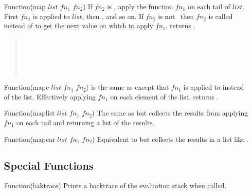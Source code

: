 \begin{defun}{Function}{(map $list$ $fn_{1}$ $fn_{2}$)}
  If $fn_{2}$ is \NIL, apply the function $fn_{1}$ on each tail of
  $list$. First $fn_{1}$ is applied to $list$, then ,
  and so on. If $fn_{2}$ is not \NIL\ then $fn_{2}$ is called instead
  of  to get the next value on which to apply $fn_{1}$.
   returns \NIL.

  \begin{quote}
    \\
    \\
    \\
    \\
    \NIL
  \end{quote}

\end{defun}

\begin{defun}{Function}{(mapc $list$ $fn_{1}$ $fn_{2}$)}
   is the same as  except that $fn_{1}$ is
  applied to  instead of the list. Effectively
  applying $fn_{1}$ on each element of the list.  returns
  \NIL.
\end{defun}


\begin{defun}{Function}{(maplist $list$ $fn_{1}$ $fn_{2}$)}
  The same as  but collects the results from applying
  $fn_{1}$ on each tail and returning a list of the results.

\end{defun}

\begin{defun}{Function}{(mapcar $list$ $fn_{1}$ $fn_{2}$)}
  Equivalent to  but collects the results in a list like
  .

\end{defun}

\subsection{Special Functions}

\begin{defun}{Function}{(baktrace)}
  Prints a backtrace of the evaluation stack when called.
\end{defun}

